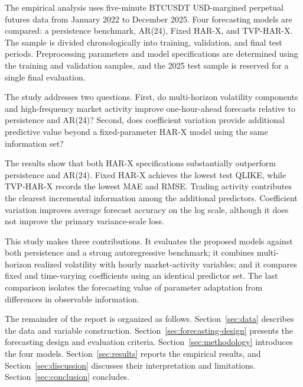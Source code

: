 The empirical analysis uses five-minute BTCUSDT
USD-margined perpetual futures data from January 2022 to
December 2025. Four forecasting models are compared: a
persistence benchmark, AR(24), Fixed HAR-X, and TVP-HAR-X.
The sample is divided chronologically into training,
validation, and final test periods. Preprocessing parameters
and model specifications are determined using the training and
validation samples, and the 2025 test sample is reserved for a
single final evaluation.

The study addresses two questions. First, do multi-horizon
volatility components and high-frequency market activity
improve one-hour-ahead forecasts relative to persistence and
AR(24)? Second, does coefficient variation provide additional
predictive value beyond a fixed-parameter HAR-X model using the
same information set?

The results show that both HAR-X specifications substantially
outperform persistence and AR(24). Fixed HAR-X achieves the
lowest test QLIKE, while TVP-HAR-X records the lowest MAE and
RMSE. Trading activity contributes the clearest incremental
information among the additional predictors. Coefficient
variation improves average forecast accuracy on the log scale,
although it does not improve the primary variance-scale loss.

This study makes three contributions. It evaluates the proposed
models against both persistence and a strong autoregressive
benchmark; it combines multi-horizon realized volatility with
hourly market-activity variables; and it compares fixed and
time-varying coefficients using an identical predictor set.
The last comparison isolates the forecasting value of parameter
adaptation from differences in observable information.

The remainder of the report is organized as follows.
Section~\ref{sec:data} describes the data and variable
construction. Section~\ref{sec:forecasting-design} presents the
forecasting design and evaluation criteria.
Section~\ref{sec:methodology} introduces the four models.
Section~\ref{sec:results} reports the empirical results, and
Section~\ref{sec:discussion} discusses their interpretation
and limitations. Section~\ref{sec:conclusion} concludes.
